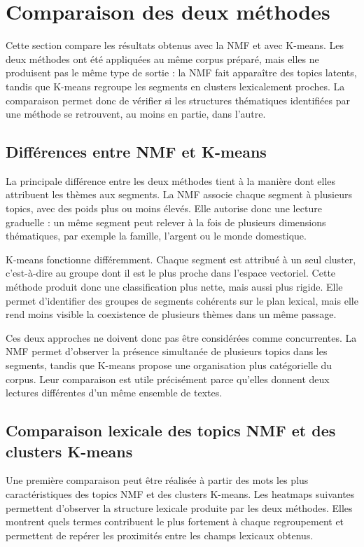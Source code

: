 
\section{Comparaison des deux méthodes}

Cette section compare les résultats obtenus avec la NMF et avec K-means. Les deux méthodes ont été appliquées au même corpus préparé, mais elles ne produisent pas le même type de sortie : la NMF fait apparaître des topics latents, tandis que K-means regroupe les segments en clusters lexicalement proches. La comparaison permet donc de vérifier si les structures thématiques identifiées par une méthode se retrouvent, au moins en partie, dans l'autre.

\subsection{Différences entre NMF et K-means}

La principale différence entre les deux méthodes tient à la manière dont elles attribuent les thèmes aux segments. La NMF associe chaque segment à plusieurs topics, avec des poids plus ou moins élevés. Elle autorise donc une lecture graduelle : un même segment peut relever à la fois de plusieurs dimensions thématiques, par exemple la famille, l'argent ou le monde domestique.

K-means fonctionne différemment. Chaque segment est attribué à un seul cluster, c'est-à-dire au groupe dont il est le plus proche dans l'espace vectoriel. Cette méthode produit donc une classification plus nette, mais aussi plus rigide. Elle permet d'identifier des groupes de segments cohérents sur le plan lexical, mais elle rend moins visible la coexistence de plusieurs thèmes dans un même passage.

Ces deux approches ne doivent donc pas être considérées comme concurrentes. La NMF permet d'observer la présence simultanée de plusieurs topics dans les segments, tandis que K-means propose une organisation plus catégorielle du corpus. Leur comparaison est utile précisément parce qu'elles donnent deux lectures différentes d'un même ensemble de textes.

\subsection{Comparaison lexicale des topics NMF et des clusters K-means}

Une première comparaison peut être réalisée à partir des mots les plus caractéristiques des topics NMF et des clusters K-means. Les heatmaps suivantes permettent d'observer la structure lexicale produite par les deux méthodes. Elles montrent quels termes contribuent le plus fortement à chaque regroupement et permettent de repérer les proximités entre les champs lexicaux obtenus.


